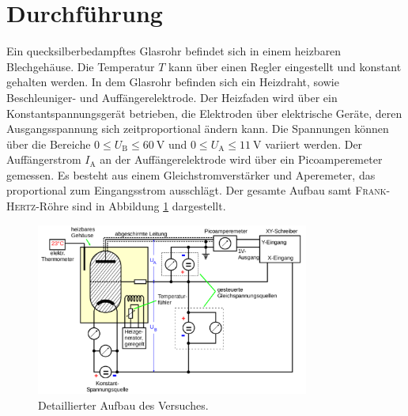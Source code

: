 \section{Durchführung}
\label{sec:Durchfuehrung}
Ein quecksilberbedampftes Glasrohr befindet sich in einem heizbaren Blechgehäuse. Die Temperatur $T$ kann über einen Regler eingestellt und konstant gehalten werden. In dem Glasrohr befinden sich ein Heizdraht, sowie Beschleuniger- und Auffängerelektrode.
Der Heizfaden wird über ein Konstantspannungsgerät betrieben, die Elektroden über elektrische Geräte, deren Ausgangsspannung sich zeitproportional ändern kann. 
Die Spannungen können über die Bereiche $0\leq U_\mathup{B} \leq \SI{60}{\volt}$ und $0\leq U_\mathup{A}\leq \SI{11}{\volt}$ variiert werden. Der Auffängerstrom $I_\mathup{A}$ an der Auffängerelektrode wird über ein Picoamperemeter gemessen.
Es besteht aus einem Gleichstromverstärker und Aperemeter, das proportional zum Eingangsstrom ausschlägt. 
Der gesamte Aufbau samt \textsc{Frank}-\textsc{Hertz}-Röhre sind in Abbildung \ref{fig:aufbau} dargestellt.
\begin{figure}
	\centering
	\includegraphics[width=0.8\textwidth]{Bilder/Aufbau_Detail.pdf}
	\caption{Detaillierter Aufbau des Versuches.}
	\label{fig:aufbau}
\end{figure}
